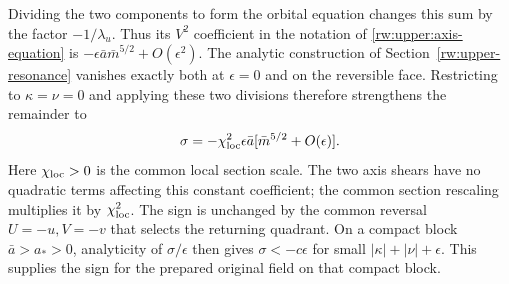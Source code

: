Dividing the two components to form the orbital equation changes
this sum by the factor $-1/\lambda_u$. Thus its $V^2$ coefficient
in the notation of \eqref{rw:upper:axis-equation} is
$-\epsilon\bar a\bar m^{5/2}+O(\epsilon^2)$.
The analytic construction of Section~\ref{rw:upper-resonance}
vanishes exactly both at $\epsilon=0$ and on the reversible face.
Restricting to $\kappa=\nu=0$ and applying these two divisions
therefore strengthens the remainder to
\begin{equation}\label{rw:finite:resonant-sign-formula}
 \sigma=-\chi_{\rm loc}^2\epsilon\bar a
                 [\bar m^{5/2}+O(\epsilon)].
\end{equation}
Here $\chi_{\rm loc}>0$ is the common local section scale.
The two axis shears have no quadratic terms affecting this constant
coefficient; the common section rescaling multiplies it by
$\chi_{\rm loc}^2$. The sign is unchanged by the common reversal
$U=-u,V=-v$ that selects the returning quadrant.
On a compact block $\bar a>a_*>0$, analyticity of $\sigma/\epsilon$
then gives $\sigma<-c\epsilon$ for small
$|\kappa|+|\nu|+\epsilon$. This supplies the sign for the prepared
original field on that compact block.
